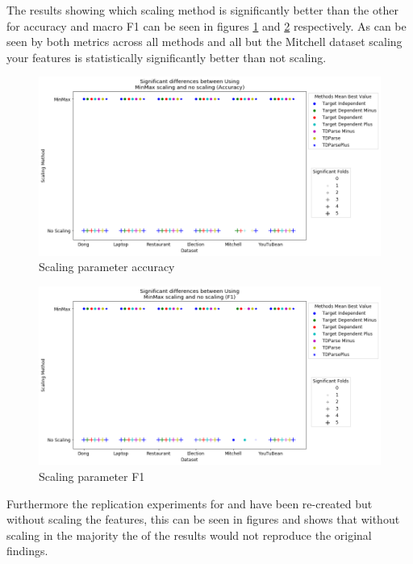 The results showing which scaling method is significantly better than the other for accuracy and macro F1 can be seen in figures \ref{fig:repro_param_scale_sig_acc} and \ref{fig:repro_param_scale_sig_f1} respectively. As can be seen by both metrics across all methods and all but the Mitchell dataset scaling your features is statistically significantly better than not scaling.
\begin{figure}[!htb]
    \centering
    \includegraphics[scale=0.4]{images/reproducibility/Parameters/Scaling/Scaling_Sig_Plot_Accuracy.png}
    \caption{Scaling parameter accuracy}
    \label{fig:repro_param_scale_sig_acc}
\end{figure}
\begin{figure}[!htb]
    \centering
    \includegraphics[scale=0.4]{images/reproducibility/Parameters/Scaling/Scaling_Sig_Plot_F1.png}
    \caption{Scaling parameter F1}
    \label{fig:repro_param_scale_sig_f1}
\end{figure}
Furthermore the replication experiments for \citet{vo2015target} and \citet{wang-etal-2017-tdparse} have been re-created but without scaling the features, this can be seen in figures and shows that without scaling in the majority the of the results would not reproduce the original findings.
